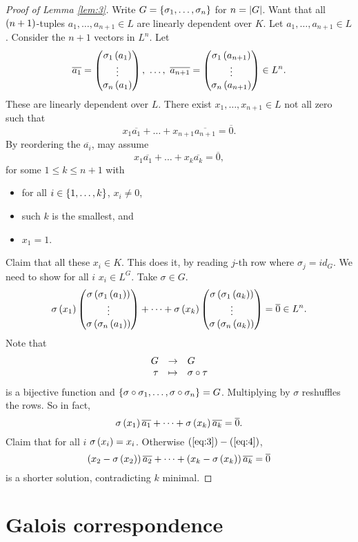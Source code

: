 \begin{proof}[Proof of Lemma \ref{lem:3}]
Write $ G = \left\{ \sigma_1, \dots, \sigma_n \right\} $ for $ n = \left\lvert G \right\rvert $. Want that all $ \left( n + 1 \right) $-tuples $ a_1, \dots, a_{n + 1} \in L $ are linearly dependent over $ K $. Let $ a_1, \dots, a_{n + 1} \in L $. Consider the $ n + 1 $ vectors in $ L^n $. Let
$$ \overline{a_1} = \threebyone{\sigma_1\rb{a_1}}{\vdots}{\sigma_n\rb{a_1}}, \ \dots, \ \overline{a_{n + 1}} = \threebyone{\sigma_1\rb{a_{n + 1}}}{\vdots}{\sigma_n\rb{a_{n + 1}}} \in L^n. $$
These are linearly dependent over $ L $. There exist $ x_1, \dots, x_{n + 1} \in L $ not all zero such that
$$ x_1\overline{a_1} + \dots + x_{n + 1}\overline{a_{n + 1}} = \overline{0}. $$
By reordering the $ \overline{a_i} $, may assume
\begin{equation}
\label{eq:3}
x_1\overline{a_1} + \dots + x_k\overline{a_k} = \overline{0},
\end{equation}
for some $ 1 \le k \le n + 1 $ with
\begin{itemize}
\item for all $ i \in \left\{ 1, \dots, k \right\} $, $ x_i \ne 0 $,
\item such $ k $ is the smallest, and
\item $ x_1 = 1 $.
\end{itemize}
Claim that all these $ x_i \in K $. This does it, by reading $ j $-th row where $ \sigma_j = id_G $. We need to show for all $ i $ $ x_i \in L^G $. Take $ \sigma \in G $.
$$ \sigma\left( x_1 \right)\begin{pmatrix} \sigma\left( \sigma_1\left( a_1 \right) \right) \\ \vdots \\ \sigma\left( \sigma_n\left( a_1 \right) \right) \end{pmatrix} + \dots + \sigma\left( x_k \right)\begin{pmatrix} \sigma\left( \sigma_1\left( a_k \right) \right) \\ \vdots \\ \sigma\left( \sigma_n\left( a_k \right) \right) \end{pmatrix} = \overline{0} \in L^n. $$
Note that
$$ \function{G}{G}{\tau}{\sigma \circ \tau} $$
is a bijective function and $ \left\{ \sigma \circ \sigma_1, \dots, \sigma \circ \sigma_n \right\} = G $. Multiplying by $ \sigma $ reshuffles the rows. So in fact,
\begin{equation}
\label{eq:4}
\sigma\left( x_1 \right)\overline{a_1} + \dots + \sigma\left( x_k \right)\overline{a_k} = \overline{0}.
\end{equation}
Claim that for all $ i $ $ \sigma\left( x_i \right) = x_i $. Otherwise $ \left( \ref{eq:3} \right) - \left( \ref{eq:4} \right) $,
$$ \left( x_2 - \sigma\left( x_2 \right) \right)\overline{a_2} + \dots + \left( x_k - \sigma\left( x_k \right) \right)\overline{a_k} = \overline{0} $$
is a shorter solution, contradicting $ k $ minimal.
\end{proof}

\pagebreak

\section{Galois correspondence}

